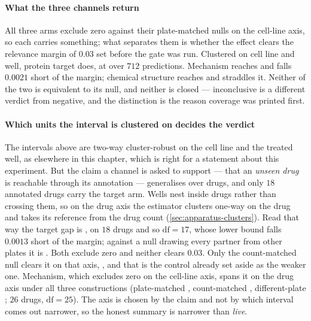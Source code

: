 

\paragraph{What the three channels return} All three arms exclude zero against
their plate-matched nulls on the cell-line axis, so each carries something; what
separates them is whether the effect clears the relevance margin of $0.03$ set
before the gate was run. Clustered on cell line and well, protein target does, at
 over $712$ predictions. Mechanism reaches
 and falls $0.0021$ short of the margin; chemical
structure reaches  and straddles it. Neither of the
two is equivalent to its null, and neither is closed --- inconclusive is a
different verdict from negative, and the distinction is the reason coverage was
printed first.

\paragraph{Which units the interval is clustered on decides the verdict} The
intervals above are two-way cluster-robust on the cell line and the treated well,
as elsewhere in this chapter, which is right for a statement about this
experiment. But the claim a channel is asked to support --- that an \emph{unseen
drug} is reachable through its annotation --- generalises over drugs, and only
$18$ annotated drugs carry the target arm. Wells nest inside drugs rather than
crossing them, so on the drug axis the estimator clusters one-way on the drug and
takes its reference from the drug count (\cref{sec:apparatus-clusters}). Read that
way the target gap is , on $18$ drugs and so
$\mathrm{df} = 17$,
whose lower bound falls $0.0013$ short of the margin; against a null drawing every
partner from other plates it is . Both exclude zero
and neither clears $0.03$. Only the count-matched null clears it on that axis,
, and that is the control already set aside as the
weaker one. Mechanism, which excludes zero on the cell-line axis, spans it on the drug axis under all three constructions (plate-matched , count-matched , different-plate ; $26$ drugs, $\mathrm{df} = 25$). The axis is chosen by the claim and not
by which interval comes out narrower, so the honest summary is narrower than
\emph{live}.

